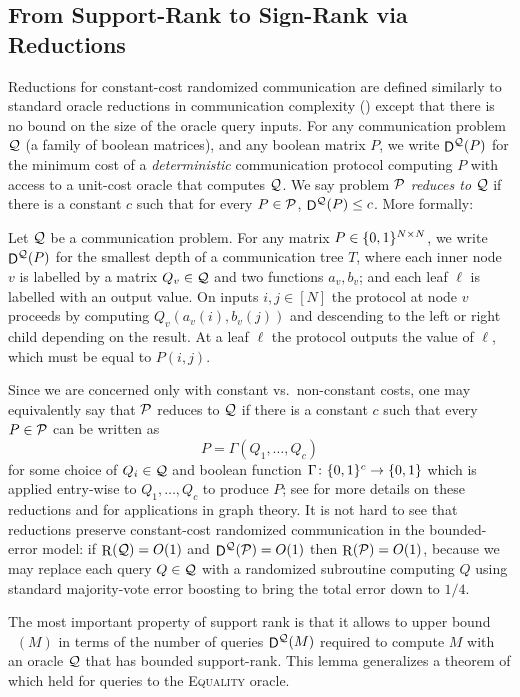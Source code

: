 \documentclass[conference]{IEEEtran}
\DeclareMathOperator{\signrank}{rank_\pm}
\DeclareMathOperator{\Rand}{R}
\DeclareMathOperator{\D}{\mathsf{D}}
\begin{document}
\subsection{From Support-Rank to Sign-Rank via Reductions} \label{sec:reductions}

Reductions for constant-cost randomized communication are defined similarly to standard oracle
reductions in communication complexity (\eg \cite{BFS86,CLV19}) except that there is no bound on the
size of the oracle query inputs. For any communication problem $\mathcal{Q}$ (\ie a family of boolean
matrices), and any boolean matrix $P$,  we write $\D^\cQ(P)$ for the minimum cost of a
\emph{deterministic} communication protocol computing $P$ with access to a unit-cost oracle that
computes $\mathcal{Q}$. We say problem $\mathcal{P}$ \emph{reduces to} $\mathcal{Q}$ if there is a constant $c$ such that
for every $P \in \mathcal{P}$, $\D^\cQ(P) \leq c$. More formally:

\begin{definition}
Let $\mathcal{Q}$ be a communication problem. For any matrix $P \in \{0,1\}^{N \times N}$, we write
$\D^\cQ(P)$ for the smallest depth of a communication tree $T$, where each inner
node $v$ is labelled by a matrix $Q_v \in \mathcal{Q}$ and two functions $a_v,b_v$; and
each leaf $\ell$ is labelled with an output value. On inputs $i,j \in [N]$ the
protocol at node $v$ proceeds by computing $Q_v(a_v(i),b_v(j))$ and descending
to the left or right child depending on the result. At a leaf $\ell$ the
protocol outputs the value of $\ell$, which must be equal to $P(i,j)$.
\end{definition}
Since we are concerned only with constant vs.\ non-constant costs, one may equivalently say that $
\mathcal{P}$ reduces to $\mathcal{Q}$ if there is a constant $c$ such that every $P \in \mathcal{P}$ can be written as
\[
    P = \Gamma(Q_1, \dotsc, Q_c)
\]
for some choice of $Q_i \in \mathcal{Q}$ and boolean function $\Gamma \colon \{0,1\}^c \to
\{0,1\}$ which is applied entry-wise to $Q_1, \dotsc, Q_c$ to produce $P$; see \eg
\cite{CLV19,FHHH24,FGHH25} for more details on these reductions and
\cite{ABSZ24} for applications in graph theory. It is not hard to see that
reductions preserve constant-cost randomized communication in the bounded-error
model: if $\Rand(\cQ) = O(1)$ and $\D^\cQ(\cP) = O(1)$ then $\Rand(\cP) = O(1)$,
because we may replace each query $Q \in \mathcal{Q}$ with a randomized subroutine
computing $Q$ using standard majority-vote error boosting to bring the total
error down to $1/4$.

The most important property of support rank is that it allows to upper bound $\signrank(M)$ in terms
of the number of queries $\D^\cQ(M)$ required to compute $M$ with an oracle $\mathcal{Q}$ that has bounded
support-rank. This lemma generalizes a theorem of \cite{HHPTZ22} which held for queries to the
\textsc{Equality} oracle.
\end{document}

